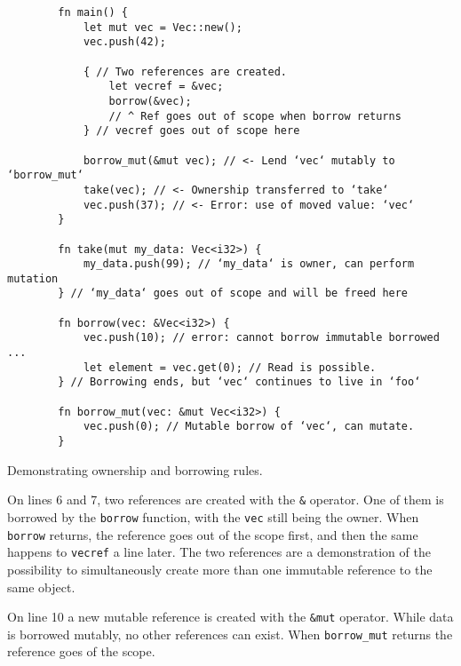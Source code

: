 \begin{listing}[!ht]

    \centering
    \begin{verbatim}
        fn main() {
            let mut vec = Vec::new();
            vec.push(42);

            { // Two references are created.
                let vecref = &vec;
                borrow(&vec);
                // ^ Ref goes out of scope when borrow returns
            } // vecref goes out of scope here

            borrow_mut(&mut vec); // <- Lend ‘vec‘ mutably to ‘borrow_mut‘
            take(vec); // <- Ownership transferred to ‘take‘
            vec.push(37); // <- Error: use of moved value: ‘vec‘
        }

        fn take(mut my_data: Vec<i32>) {
            my_data.push(99); // ‘my_data‘ is owner, can perform mutation
        } // ‘my_data‘ goes out of scope and will be freed here

        fn borrow(vec: &Vec<i32>) {
            vec.push(10); // error: cannot borrow immutable borrowed ...
            let element = vec.get(0); // Read is possible.
        } // Borrowing ends, but ‘vec‘ continues to live in ‘foo‘

        fn borrow_mut(vec: &mut Vec<i32>) {
            vec.push(0); // Mutable borrow of ‘vec‘, can mutate.
        }
    \end{verbatim}

    \caption{Demonstrating ownership and borrowing rules.}
    \label{lst:ownership-and-borrowing}
\end{listing}

On lines 6 and 7, two references are created with the \texttt{&} operator. One of them is borrowed by the \texttt{borrow} function, with the \texttt{vec} still being the owner. When \texttt{borrow} returns, the reference goes out of the scope first, and then the same happens to \texttt{vecref} a line later. The two references are a demonstration of the possibility to simultaneously create more than one immutable reference to the same object.

On line 10 a new mutable reference is created with the \texttt{&mut} operator. While data is borrowed mutably, no other references can exist. When \texttt{borrow_mut} returns the reference goes of the scope.

